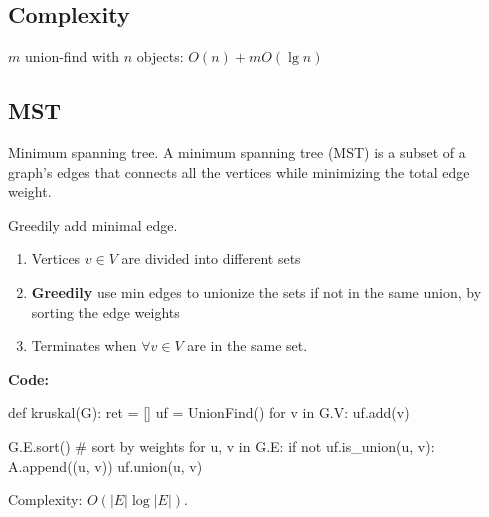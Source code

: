 \subsection{Complexity}
$m$ union-find with $n$ objects: $O(n)+m O(\lg n)$

\subsection{MST}
Minimum spanning tree. A minimum spanning tree (MST) is a subset of a graph's edges that connects all the vertices while minimizing the total edge weight.

 Greedily add minimal edge. 

\begin{enumerate}
\item Vertices $v \in V$ are divided into different sets
\item \textbf{Greedily} use min edges to unionize the sets if not in the same union, by sorting the edge weights
\item Terminates when $\forall v\in V$ are in the same set.
\end{enumerate}
\textbf{Code:}
\begin{python}[mathescape]
def kruskal(G):
  ret = []
  uf = UnionFind()
  for v in G.V:
    uf.add(v)

  G.E.sort()  # sort by weights
  for u, v in G.E:
    if not uf.is_union(u, v):
      A.append((u, v))
      uf.union(u, v)
\end{python}
Complexity: $O(|E|\log |E|)$.

